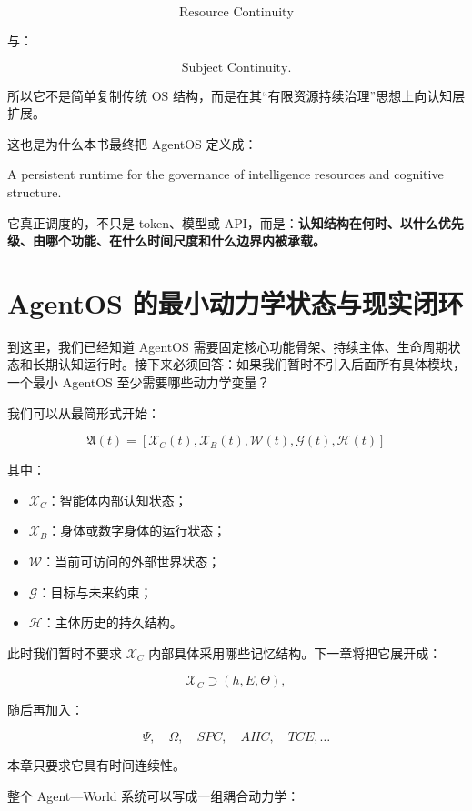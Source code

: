 \[
\text{Resource Continuity}
\]

与：

\[
\text{Subject Continuity}.
\]

所以它不是简单复制传统 OS 结构，而是在其“有限资源持续治理”思想上向认知层扩展。

这也是为什么本书最终把 AgentOS 定义成：

\begin{definition*}
A persistent runtime for the governance of intelligence resources and cognitive structure.
\end{definition*}

它真正调度的，不只是 token、模型或 API，而是：\textbf{认知结构在何时、以什么优先级、由哪个功能、在什么时间尺度和什么边界内被承载。}

\section{AgentOS 的最小动力学状态与现实闭环}

到这里，我们已经知道 AgentOS 需要固定核心功能骨架、持续主体、生命周期状态和长期认知运行时。接下来必须回答：如果我们暂时不引入后面所有具体模块，一个最小 AgentOS 至少需要哪些动力学变量？

我们可以从最简形式开始：

\[
\boxed{
\mathfrak{A}(t)
=
[
\mathcal{X}_C(t),
\mathcal{X}_B(t),
\mathcal{W}(t),
\mathcal{G}(t),
\mathcal{H}(t)
]
}
\]

其中：

\begin{itemize}
    \item $\mathcal{X}_C$：智能体内部认知状态；
    \item $\mathcal{X}_B$：身体或数字身体的运行状态；
    \item $\mathcal{W}$：当前可访问的外部世界状态；
    \item $\mathcal{G}$：目标与未来约束；
    \item $\mathcal{H}$：主体历史的持久结构。
\end{itemize}

此时我们暂时不要求 $\mathcal{X}_C$ 内部具体采用哪些记忆结构。下一章将把它展开成：

\[
\mathcal{X}_C
\supset
(h,E,\Theta),
\]

随后再加入：

\[
\Psi,\quad \Omega,\quad SPC,\quad AHC,\quad TCE,\ldots
\]

本章只要求它具有时间连续性。

整个 Agent—World 系统可以写成一组耦合动力学：

